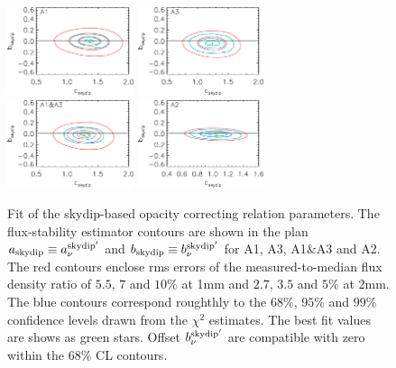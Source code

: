 \begin{figure}[ht!]
  \begin{center}
    \includegraphics[clip=true, trim={0, -0.3cm, -0.3cm, 0}, width=0.33\textwidth]{Figures/Opacity/fit_nika2_tau_from_skydip_mwc349_a1.pdf}
    \includegraphics[clip=true, trim={0, -0.3cm, -0.3cm, 0}, width=0.33\textwidth]{Figures/Opacity/fit_nika2_tau_from_skydip_mwc349_a3.pdf}
    \includegraphics[clip=true, trim={0, -0.3cm, -0.3cm, 0}, width=0.33\textwidth]{Figures/Opacity/fit_nika2_tau_from_skydip_mwc349_1mm.pdf}
    \includegraphics[clip=true, trim={0, -0.3cm, -0.3cm, 0}, width=0.33\textwidth]{Figures/Opacity/fit_nika2_tau_from_skydip_mwc349_a2.pdf}
    \caption[NIKA2 skydip-based opacity correcting
    relation]{Fit of the skydip-based opacity correcting relation
    parameters.
    The flux-stability estimator contours are shown in the plan
    $a_{\rm{skydip}} \equiv a_\nu^{\rm{skydip}'}$ and
    $b_{\rm{skydip}} \equiv b_\nu^{\rm{skydip}'}$
    for A1, A3, A1$\&$A3 and A2.
    The red contours enclose rms
    errors of the measured-to-median flux density ratio of $5.5$, $7$
    and $10\%$ at 1mm and $2.7$, $3.5$ and $5\%$ at 2mm. The blue
    contours correspond roughthly to the $68\%$, $95\%$ and $99\%$
    confidence levels drawn from the $\chi^2$ estimates.
    The best fit values are shows as green stars. Offset
    $b_\nu^{\rm{skydip}'}$ are compatible with zero within the $68\%$
    CL contours.} 
\label{fig:skydip_fit}
\end{center}
\end{figure}

